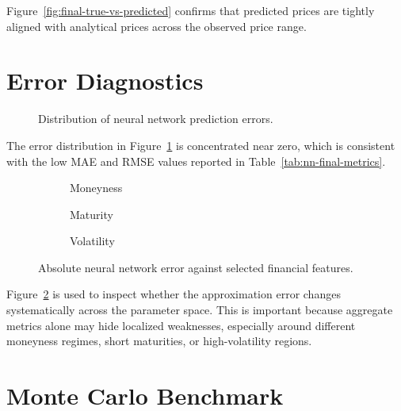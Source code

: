 Figure~\ref{fig:final-true-vs-predicted} confirms that predicted prices are tightly aligned with analytical prices across the observed price range.

\section{Error Diagnostics}

\begin{figure}[H]
    \centering
    \caption{Distribution of neural network prediction errors.}
    \label{fig:final-error-distribution}
\end{figure}

The error distribution in Figure~\ref{fig:final-error-distribution} is concentrated near zero, which is consistent with the low MAE and RMSE values reported in Table~\ref{tab:nn-final-metrics}.

\begin{figure}[H]
    \centering
    \begin{subfigure}{0.32\linewidth}
        \centering
        \caption{Moneyness}
    \end{subfigure}
    \begin{subfigure}{0.32\linewidth}
        \centering
        \caption{Maturity}
    \end{subfigure}
    \begin{subfigure}{0.32\linewidth}
        \centering
        \caption{Volatility}
    \end{subfigure}
    \caption{Absolute neural network error against selected financial features.}
    \label{fig:final-error-diagnostics}
\end{figure}

Figure~\ref{fig:final-error-diagnostics} is used to inspect whether the approximation error changes systematically across the parameter space.
This is important because aggregate metrics alone may hide localized weaknesses, especially around different moneyness regimes, short maturities, or high-volatility regions.

\section{Monte Carlo Benchmark}

